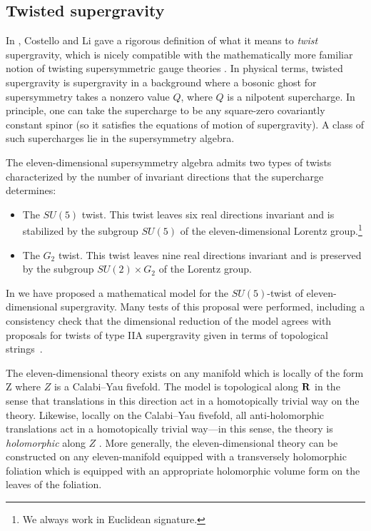 \documentclass[../main.tex]{subfiles}
\begin{document}
\subsection{Twisted supergravity}

In \cite{CLsugra}, Costello and Li gave a rigorous definition of what it means to {\em twist} supergravity, which is nicely compatible with the mathematically more familiar notion of twisting supersymmetric gauge theories \cite{WittenTwist}.
In physical terms, twisted supergravity is supergravity in a background where a bosonic ghost for supersymmetry takes a nonzero value $Q$, where $Q$ is a nilpotent supercharge.
In principle, one can take the supercharge to be any square-zero covariantly constant spinor (so it satisfies the equations of motion of supergravity).
A class of such supercharges lie in the supersymmetry algebra.

The eleven-dimensional supersymmetry algebra admits two types of twists characterized by the number of invariant directions that the supercharge determines:
\begin{itemize}
\item 
The $SU(5)$ twist. 
This twist leaves six real directions invariant and is stabilized by the subgroup $SU(5)$ of the eleven-dimensional Lorentz group.\footnote{We always work in Euclidean signature.}
\item 
The $G_2$ twist.
This twist leaves nine real directions invariant and is preserved by the subgroup $SU(2) \times G_2$ of the Lorentz group. 
\end{itemize}

In \cite{RSW} we have proposed a mathematical model for the $SU(5)$-twist of eleven-dimensional supergravity.
Many tests of this proposal were performed, including a consistency check that the dimensional reduction of the model agrees with proposals for twists of type IIA supergravity given in terms of topological strings~\cite{CLsugra}.

The eleven-dimensional theory exists on any manifold which is locally of the form 
\beqn\label{eqn:local}
\R \times Z
\eeqn
where $Z$ is a Calabi--Yau fivefold.
The model is topological along $\mathbf{R}$ in the sense that translations in this direction act in a homotopically trivial way on the theory.
Likewise, locally on the Calabi--Yau fivefold, all anti-holomorphic translations act in a homotopically trivial way---in this sense, the theory is {\em holomorphic} along $Z$ \cite{BWhol}.
More generally, the eleven-dimensional theory can be constructed on any eleven-manifold equipped with a transversely holomorphic foliation which is equipped with an appropriate holomorphic volume form on the leaves of the foliation.
\end{document}
